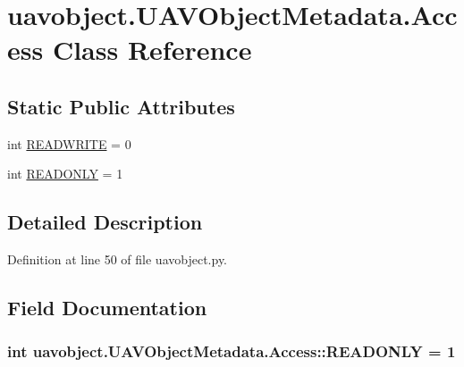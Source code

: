 \hypertarget{classuavobject_1_1_u_a_v_object_metadata_1_1_access}{\section{uavobject.\-U\-A\-V\-Object\-Metadata.\-Access \-Class \-Reference}
\label{classuavobject_1_1_u_a_v_object_metadata_1_1_access}
}
\subsection*{\-Static \-Public \-Attributes}
\begin{DoxyCompactItemize}
\item 
int \hyperlink{classuavobject_1_1_u_a_v_object_metadata_1_1_access_ad34b855419d508cfdbeb7a63feda9d23}{\-R\-E\-A\-D\-W\-R\-I\-T\-E} = 0
\item 
int \hyperlink{classuavobject_1_1_u_a_v_object_metadata_1_1_access_a7d3f180dba3769cbd619786fbb2262b2}{\-R\-E\-A\-D\-O\-N\-L\-Y} = 1
\end{DoxyCompactItemize}


\subsection{\-Detailed \-Description}


\-Definition at line 50 of file uavobject.\-py.



\subsection{\-Field \-Documentation}
\hypertarget{classuavobject_1_1_u_a_v_object_metadata_1_1_access_a7d3f180dba3769cbd619786fbb2262b2}{
\subsubsection[{\-R\-E\-A\-D\-O\-N\-L\-Y}]{\setlength{\rightskip}{0pt plus 5cm}int {\bf uavobject.\-U\-A\-V\-Object\-Metadata.\-Access\-::\-R\-E\-A\-D\-O\-N\-L\-Y} = 1}}\label{classuavobject_1_1_u_a_v_object_metadata_1_1_access_a7d3f180dba3769cbd619786fbb2262b2}


